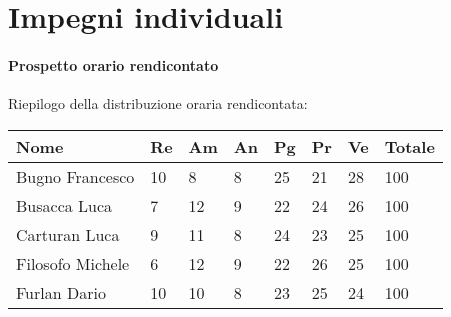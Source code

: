 \section{Impegni individuali} \label{section:Impegni_individuali}


\paragraph{Prospetto orario rendicontato}
Riepilogo della distribuzione oraria rendicontata:

\begin{table}
\begin{tabular}{l|llllll|l}
\rowcolor[HTML]{C0C0C0} 
\textbf{Nome}                       & \textbf{Re}               & \textbf{Am}               & \textbf{An}              & \textbf{Pg}               & \textbf{Pr}               & \textbf{Ve}               & \textbf{Totale}            \\ \hline
\rowcolor[HTML]{EFEFEF} 
Bugno Francesco                     & 10                        & 8                         & 8                        & 25                        & 21                        & 28                        & 100                        \\
\rowcolor[HTML]{DEDEDE} 
Busacca Luca                        & 7                         & 12                        & 9                        & 22                        & 24                        & 26                        & 100                        \\
\rowcolor[HTML]{E8E8E8} 
Carturan Luca                       & 9                         & 11                        & 8                        & 24                        & 23                        & 25                        & 100                        \\
\rowcolor[HTML]{DEDEDE} 
Filosofo Michele                    & 6                         & 12                        & 9                        & 22                        & 26                        & 25                        & 100                        \\
\rowcolor[HTML]{E8E8E8} 
Furlan Dario 						&  10						& 10						& 8						   & 23 					   & 25						   & 24 					   & 100						\\

\end{tabular}
\end{table}
